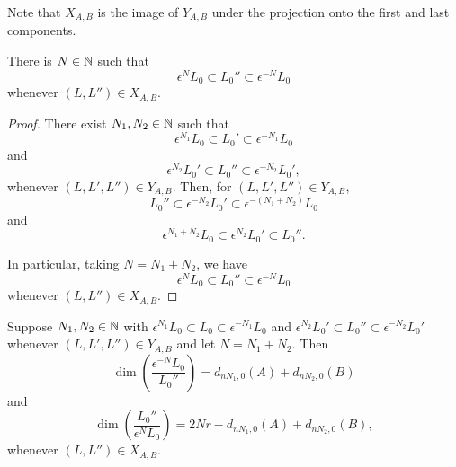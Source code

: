 \documentclass[a4paper, 11pt]{report}
\begin{document}
Note that $X_{A,B}$ is the image of $Y_{A,B}$ under the projection onto the first and last components.

\begin{lemma}\label{lemma:orbit-products-are-bounded}
There is $N\in\mathbb{N}$ such that
\begin{equation*}
\epsilon^N L_0\subset L_0''\subset \epsilon^{-N}L_0
\end{equation*}
whenever $(L,L'')\in X_{A,B}$.
\end{lemma}

\begin{proof}
There exist $N_1,N_2\in\mathbb{N}$ such that
\begin{equation*}
\epsilon^{N_1}L_0\subset L_0'\subset \epsilon^{-N_1}L_0
\end{equation*}
and
\begin{equation*}
\epsilon^{N_2}L_0'\subset L_0''\subset \epsilon^{-N_2}L_0',
\end{equation*}
whenever $(L,L',L'')\in Y_{A,B}$. Then, for $(L,L',L'')\in Y_{A,B}$,
\begin{equation*}
L_0''\subset \epsilon^{-N_2} L_0' \subset \epsilon^{-(N_1+N_2)} L_0
\end{equation*}
and
\begin{equation*}
\epsilon^{N_1+N_2}L_0\subset \epsilon^{N_2}L_0'\subset L_0''.
\end{equation*}

In particular, taking $N=N_1 + N_2$, we have
\begin{equation*}
\epsilon^N L_0 \subset L_0'' \subset \epsilon^{-N}L_0
\end{equation*}
whenever $(L,L'')\in X_{A,B}$.
\end{proof}

\begin{lemma}\label{lemma:codimensions-in-orbit-product}
Suppose $N_1,N_2\in\mathbb{N}$ with $\epsilon^{N_1}L_0\subset L_0\subset \epsilon^{-N_1}L_0$ and $\epsilon^{N_2}L_0'\subset L_0''\subset \epsilon^{-N_2}L_0'$ whenever $(L,L',L'')\in Y_{A,B}$ and let $N = N_1 + N_2$. Then
\begin{equation*}
\dim\left(\frac{\epsilon^{-N}L_0}{L_0''}\right) = d_{nN_1,0}(A) + d_{nN_2,0}(B)
\end{equation*}
and
\begin{equation*}
\dim\left(\frac{L_0''}{\epsilon^N L_0}\right) = 2Nr - d_{nN_1,0}(A) + d_{nN_2,0}(B),
\end{equation*}
whenever $(L,L'')\in X_{A,B}$.
\end{lemma}
\end{document}
